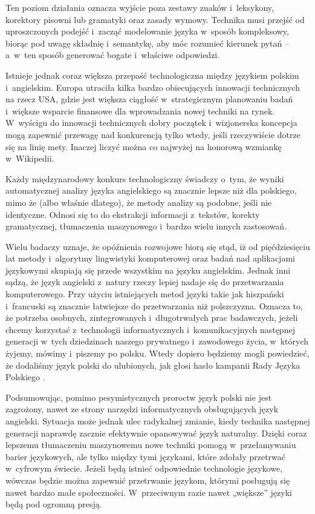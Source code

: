 \begin{multicols}{2}
Ten poziom działania oznacza wyjście poza zestawy znaków
i~leksykony, korektory pisowni lub gramatyki oraz zasady wymowy.
Technika musi przejść od uproszczonych podejść i~zacząć
modelowanie języka w~sposób kompleksowy, biorąc pod uwagę
składnię i~semantykę, aby móc rozumieć kierunek pytań -- a~w~ten
sposób generować bogate i~właściwe odpowiedzi. 

Istnieje jednak coraz większa przepaść technologiczna między
językiem polskim i~angielskim. Europa utraciła kilka bardzo
obiecujących innowacji technicznych na rzecz USA, gdzie jest większa
ciągłość w~strategicznym planowaniu badań i~większe wsparcie
finansowe dla wprowadzania nowej techniki na rynek. W~wyścigu do
innowacji technicznych dobry początek i~wizjonerska koncepcja mogą
zapewnić przewagę nad konkurencją tylko wtedy, jeśli rzeczywiście
dotrze się na linię mety. Inaczej liczyć można co najwyżej na
honorową wzmiankę w~Wikipedii. 

Każdy międzynarodowy konkurs technologiczny świadczy o~tym, że
wyniki automatycznej analizy języka angielskiego są znacznie lepsze
niż dla polskiego, mimo że (albo właśnie dlatego), że metody
analizy są podobne, jeśli nie identyczne. Odnosi się to do
ekstrakcji informacji z~tekstów, korekty gramatycznej, tłumaczenia
maszynowego i~bardzo wielu innych zastosowań. 

Wielu badaczy uznaje, że opóźnienia rozwojowe biorą się stąd,
iż od pięćdziesięciu lat metody i~algorytmy lingwistyki
komputerowej oraz badań nad aplikacjami językowymi skupiają się
przede wszystkim na języku angielskim. Jednak inni sądzą, że
język angielski z~natury rzeczy lepiej nadaje się do przetwarzania
komputerowego. Przy użyciu istniejących metod języki takie jak
hiszpański i~francuski są znacznie łatwiejsze do przetwarzania niż
polszczyzna. Oznacza to, że potrzeba osobnych, zintegrowanych
i~długotrwałych prac badawczych, jeżeli chcemy korzystać
z~technologii informatycznych i~komunikacyjnych następnej generacji
w~tych dziedzinach naszego prywatnego i~zawodowego życia, w~których
żyjemy, mówimy i~piszemy po polsku. Wtedy dopiero będziemy mogli
powiedzieć, że dodaliśmy język polski do ulubionych, jak głosi
hasło kampanii Rady Języka Polskiego \cite{rjp1}. 

Podsumowując, pomimo pesymistycznych proroctw język polski nie jest
zagrożony, nawet ze strony narzędzi informatycznych obsługujących
język angielski. Sytuacja może jednak ulec radykalnej zmianie, kiedy
technika następnej generacji naprawdę zacznie efektywnie opanowywać
język naturalny. Dzięki coraz lepszemu tłumaczeniu maszynowemu nowe
techniki pomogą w~przełamywaniu barier językowych, ale tylko
między tymi językami, które zdołały przetrwać w~cyfrowym
świecie. Jeżeli będą istnieć odpowiednie technologie językowe,
wówczas będzie można zapewnić przetrwanie językom, którymi
posługują się nawet bardzo małe społeczności. W~przeciwnym razie
nawet „większe” języki będą pod ogromną presją. 


\end{multicols}
